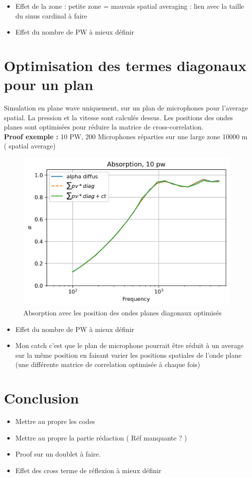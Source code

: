 \documentclass[
a4paper, %
12pt, %
]{SourcesTemplate/TemplateReport}
\begin{document}
\begin{itemize}
	\item Effet de la zone : petite zone = mauvais spatial averaging : lien avec la taille du sinus cardinal à faire 
	\item Effet du nombre de PW à mieux définir 
\end{itemize}

\section{Optimisation des termes diagonaux pour un plan }
Simulation en plane wave uniquement, sur un plan de microphones pour l'average spatial. La pression et la vitesse sont calculés dessus. Les positions des ondes planes sont optimisées pour réduire la matrice de cross-correlation.\\

\textbf{Proof exemple : }10 PW, 200 Microphones réparties sur une large zone 10000 m ( spatial average)\\
\begin{figure}[h!]
	\centering
	\includegraphics[width=0.7\linewidth]{images/cross7}
	\caption{Absorption avec les position des ondes planes diagonaux optimisés}
	\label{fig:cross7}
\end{figure}

\begin{itemize}
	\item Effet du nombre de PW à mieux définir 
	\item  Mon catch c'est que le plan de microphone pourrait être réduit à un average sur la même position en faisant varier les positions spatiales de l'onde plane (une différente matrice de correlation optimisée à chaque fois) 
\end{itemize}

\section{Conclusion}
\begin{itemize}[label = \textbullet]
	\item Mettre au propre les codes
	\item Mettre au propre la partie rédaction ( Réf manquante ? )
	\item Proof sur un doublet à faire.
	\item Effet des cross terme de réflexion à mieux définir
\end{itemize}




\end{document}
